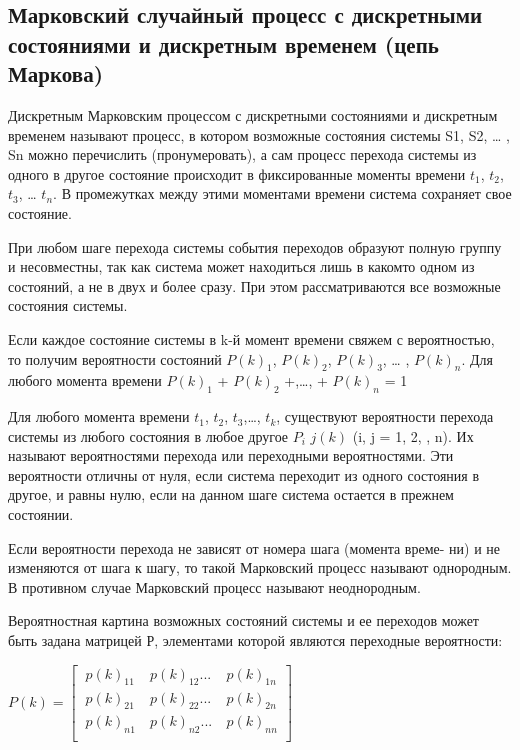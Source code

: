\documentclass[12pt]{article}
\begin{document}
\subsection{Марковский случайный процесс с дискретными состояниями и дискретным временем (цепь Маркова)}

Дискретным Марковским процессом с дискретными состояниями и дискретным временем называют процесс, в котором возможные состояния системы S1, S2, … , Sn можно перечислить (пронумеровать), а сам процесс перехода системы из одного в другое состояние происходит в фиксированные моменты времени $t_1$, $t_2$, $t_3$, … $t_n$. В промежутках между этими моментами времени система сохраняет свое состояние.

При любом шаге перехода системы события переходов образуют полную группу и несовместны, так как система может находиться лишь в какомто одном из состояний, а не в двух и более сразу. При этом рассматриваются
все возможные состояния системы. 

Если каждое состояние системы в k-й момент времени свяжем с вероятностью, то получим вероятности состояний $P(k)_1$, $P(k)_2$, $P(k)_3$, … , $P(k)_n$. Для
любого момента времени $P(k)_1$ + $P(k)_2$ +,…, + $P(k)_n$ = 1

Для любого момента времени $t_1$, $t_2$, $t_3$,…, $t_k$, существуют вероятности перехода системы из любого состояния в любое другое $P_i$ $j(k)$ (i, j = 1, 2, , n). Их
называют вероятностями перехода или переходными вероятностями. Эти вероятности отличны от нуля, если система переходит из одного состояния в
другое, и равны нулю, если на данном шаге система остается в прежнем состоянии. 

Если вероятности перехода не зависят от номера шага (момента време-
ни) и не изменяются от шага к шагу, то такой Марковский процесс называют
однородным. В противном случае Марковский процесс называют неоднородным.

Вероятностная картина возможных состояний системы и ее переходов
может быть задана матрицей Р, элементами которой являются переходные
вероятности: 

\begin{center}

$ P(k)= \begin{bmatrix}
		\ p(k)_{11}& \ p(k)_{12}...& \ p(k)_{1n}\\
		\ p(k)_{21}& \ p(k)_{22}...& \ p(k)_{2n}\\
		\ p(k)_{n1}& \ p(k)_{n2}...& \ p(k)_{nn}\\
		\end{bmatrix}
$
\end{center}
\end{document}

